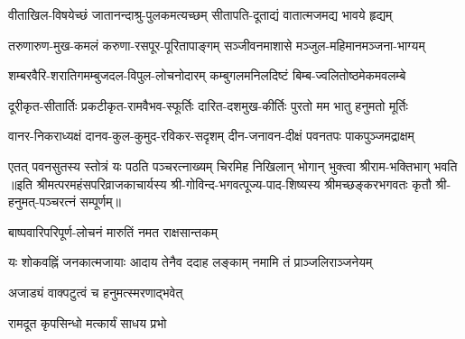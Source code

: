 
\twolineshloka
{वीताखिल-विषयेच्छं जातानन्दाश्रु-पुलकमत्यच्छम्}
{सीतापति-दूताद्यं वातात्मजमद्य भावये हृद्यम्}

\twolineshloka
{तरुणारुण-मुख-कमलं करुणा-रसपूर-पूरितापाङ्गम्}
{सञ्जीवनमाशासे मञ्जुल-महिमानमञ्जना-भाग्यम्}

\twolineshloka
{शम्बरवैरि-शरातिगमम्बुजदल-विपुल-लोचनोदारम्}
{कम्बुगलमनिलदिष्टं बिम्ब-ज्वलितोष्ठमेकमवलम्बे}

\twolineshloka
{दूरीकृत-सीतार्तिः प्रकटीकृत-रामवैभव-स्फूर्तिः}
{दारित-दशमुख-कीर्तिः पुरतो मम भातु हनुमतो मूर्तिः}

\twolineshloka
{वानर-निकराध्यक्षं दानव-कुल-कुमुद-रविकर-सदृशम्}
{दीन-जनावन-दीक्षं पवनतपः पाकपुञ्जमद्राक्षम्}

\twolineshloka
{एतत् पवनसुतस्य स्तोत्रं यः पठति पञ्चरत्नाख्यम्}
{चिरमिह निखिलान् भोगान् भुक्त्वा श्रीराम-भक्तिभाग् भवति}
॥इति श्रीमत्परमहंसपरिव्राजकाचार्यस्य श्री-गोविन्द-भगवत्पूज्य-पाद-शिष्यस्य 
श्रीमच्छङ्करभगवतः कृतौ श्री-हनुमत्-पञ्चरत्नं सम्पूर्णम्॥

{बाष्पवारिपरिपूर्ण-लोचनं मारुतिं नमत राक्षसान्तकम्‌}

{यः शोकवह्निं जनकात्मजायाः}
{आदाय तेनैव ददाह लङ्काम्}
{नमामि तं प्राञ्जलिराञ्जनेयम्}

{अजाड्यं वाक्पटुत्वं च हनुमत्स्मरणाद्भवेत्}

{रामदूत कृपसिन्धो मत्कार्यं साधय प्रभो}

